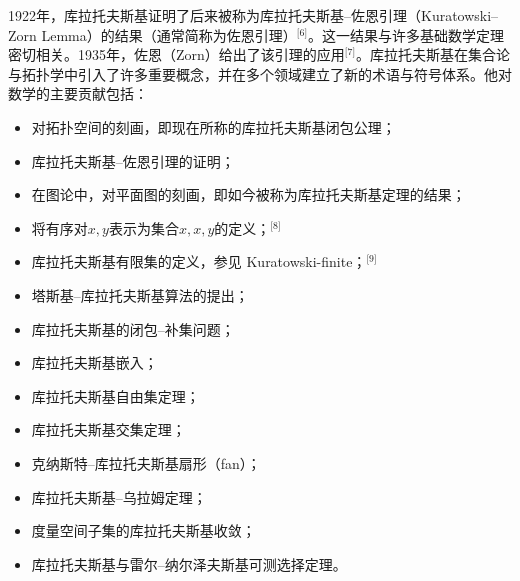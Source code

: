 1922年，库拉托夫斯基证明了后来被称为库拉托夫斯基–佐恩引理（Kuratowski–Zorn Lemma）的结果（通常简称为佐恩引理）\(^\text{[6]}\)。这一结果与许多基础数学定理密切相关。1935年，佐恩（Zorn）给出了该引理的应用\(^\text{[7]}\)。库拉托夫斯基在集合论与拓扑学中引入了许多重要概念，并在多个领域建立了新的术语与符号体系。他对数学的主要贡献包括：
\begin{itemize}
\item 对拓扑空间的刻画，即现在所称的库拉托夫斯基闭包公理；
\item 库拉托夫斯基–佐恩引理的证明；
\item 在图论中，对平面图的刻画，即如今被称为库拉托夫斯基定理的结果；
\item 将有序对$x, y$表示为集合${{x}, {x, y}}$的定义；\(^\text{[8]}\)
\item 库拉托夫斯基有限集的定义，参见 Kuratowski-finite；\(^\text{[9]}\)
\item 塔斯基–库拉托夫斯基算法的提出；
\item 库拉托夫斯基的闭包–补集问题；
\item 库拉托夫斯基嵌入；
\item 库拉托夫斯基自由集定理；
\item 库拉托夫斯基交集定理；
\item 克纳斯特–库拉托夫斯基扇形（fan）；
\item 库拉托夫斯基–乌拉姆定理；
\item 度量空间子集的库拉托夫斯基收敛；
\item 库拉托夫斯基与雷尔–纳尔泽夫斯基可测选择定理。
\end{itemize}
